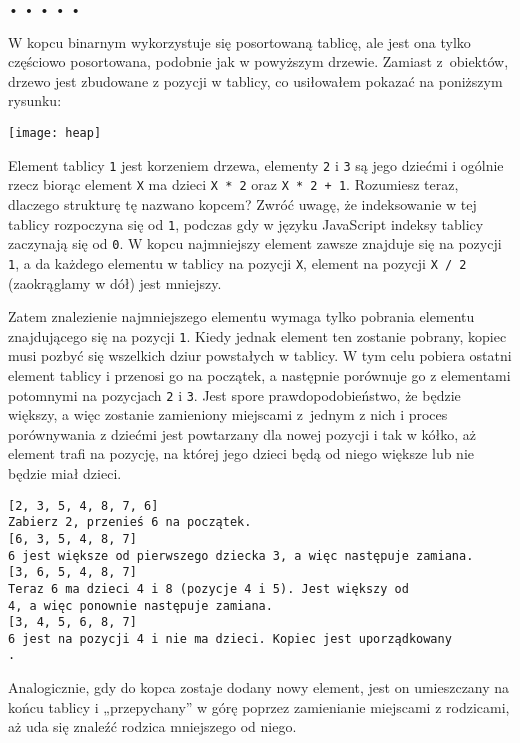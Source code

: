 \begin{center} 
 • • • • • 
 \end{center}

  
W kopcu binarnym wykorzystuje się posortowaną tablicę, ale jest ona tylko częściowo posortowana, podobnie jak w powyższym drzewie. Zamiast z~obiektów, drzewo jest zbudowane z pozycji w tablicy, co usiłowałem pokazać na poniższym rysunku:

\bigskip 
 \centerline{\texttt{[image: heap]}} 
 \smallskip
  
Element tablicy \texttt{1} jest korzeniem drzewa, elementy \texttt{2} i \texttt{3} są jego dziećmi i ogólnie rzecz biorąc element \texttt{X} ma dzieci \texttt{X * 2} oraz \texttt{X * 2 + 1}. Rozumiesz teraz, dlaczego strukturę tę nazwano kopcem? Zwróć uwagę, że indeksowanie w tej tablicy rozpoczyna się od \texttt{1}, podczas gdy w języku JavaScript indeksy tablicy zaczynają się od \texttt{0}. W kopcu najmniejszy element zawsze znajduje się na pozycji \texttt{1}, a da każdego elementu w tablicy na pozycji \texttt{X}, element na pozycji \texttt{X / 2} (zaokrąglamy w dół) jest mniejszy.

  
Zatem znalezienie najmniejszego elementu wymaga tylko pobrania elementu znajdującego się na pozycji \texttt{1}. Kiedy jednak element ten zostanie pobrany, kopiec musi pozbyć się wszelkich dziur powstałych w tablicy. W tym celu pobiera ostatni element tablicy i przenosi go na początek, a następnie porównuje go z elementami potomnymi na pozycjach \texttt{2} i \texttt{3}. Jest spore prawdopodobieństwo, że będzie większy, a więc zostanie zamieniony miejscami z~jednym z nich i proces porównywania z dziećmi jest powtarzany dla nowej pozycji i tak w kółko, aż element trafi na pozycję, na której jego dzieci będą od niego większe lub nie będzie miał dzieci.

  \begin{verbatim} 
[2, 3, 5, 4, 8, 7, 6]
Zabierz 2, przenieś 6 na początek.
[6, 3, 5, 4, 8, 7]
6 jest większe od pierwszego dziecka 3, a więc następuje zamiana.
[3, 6, 5, 4, 8, 7]
Teraz 6 ma dzieci 4 i 8 (pozycje 4 i 5). Jest większy od
4, a więc ponownie następuje zamiana.
[3, 4, 5, 6, 8, 7]
6 jest na pozycji 4 i nie ma dzieci. Kopiec jest uporządkowany
.
 \end{verbatim}
  
Analogicznie, gdy do kopca zostaje dodany nowy element, jest on umieszczany na końcu tablicy i „przepychany” w górę poprzez zamienianie miejscami z rodzicami, aż uda się znaleźć rodzica mniejszego od niego.

